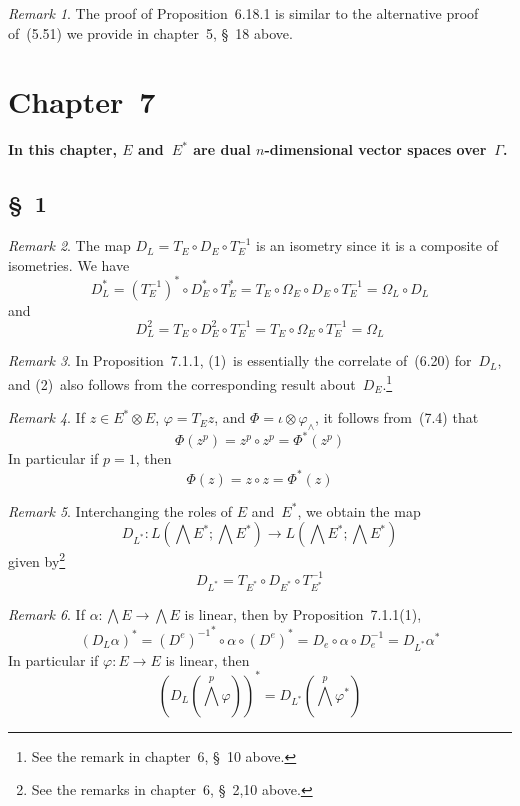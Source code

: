 \documentclass[letterpaper,12pt]{article}
\newcommand{\after}{\circ}
\newcommand{\tprod}{\otimes}
\newcommand{\eprod}{\wedge}
\newcommand{\bigeprod}{\bigwedge}
\newcommand{\medeprod}{{\textstyle\bigeprod}}
\theoremstyle{definition}
\theoremstyle{remark}
\newtheorem*{rmk}{Remark}
\begin{document}
\begin{rmk}
The proof of Proposition~6.18.1 is similar to the alternative proof of~(5.51) we provide in chapter~5, \S~18 above.
\end{rmk}

\newpage
\section*{Chapter~7}
{\boldmath\textbf{In this chapter, \(E\) and~\(E^*\) are dual \(n\)-dimensional vector spaces over~\(\Gamma\).}}

\subsection*{\S~1}
\begin{rmk}
The map \(D_L=T_E\after D_E\after T_E^{-1}\) is an isometry since it is a composite of isometries. We have
\[D_L^*=(T_E^{-1})^*\after D_E^*\after T_E^*=T_E\after\Omega_E\after D_E\after T_E^{-1}=\Omega_L\after D_L\]
and
\[D_L^2=T_E\after D_E^2\after T_E^{-1}=T_E\after\Omega_E\after T_E^{-1}=\Omega_L\]
\end{rmk}

\begin{rmk}
In Proposition~7.1.1, (1)~is essentially the correlate of~(6.20) for~\(D_L\), and (2)~also follows from the corresponding result about~\(D_E\).\footnote{See the remark in chapter~6, \S~10 above.}
\end{rmk}

\begin{rmk}
If \(z\in E^*\tprod E\), \(\varphi=T_Ez\), and \(\Phi=\iota\tprod\varphi_{\eprod}\), it follows from~(7.4) that
\[\Phi(z^p)=z^p\after z^p=\Phi^*(z^p)\]
In particular if \(p=1\), then
\[\Phi(z)=z\after z=\Phi^*(z)\]
\end{rmk}

\begin{rmk}
Interchanging the roles of \(E\) and~\(E^*\), we obtain the map
\[D_{L^*}:L(\medeprod E^*;\medeprod E^*)\to L(\medeprod E^*;\medeprod E^*)\]
given by\footnote{See the remarks in chapter~6, \S~2,10 above.}
\[D_{L^*}=T_{E^*}\after D_{E^*}\after T_{E^*}^{-1}\]
\end{rmk}

\begin{rmk}
If \(\alpha:\medeprod E\to\medeprod E\) is linear, then by Proposition~7.1.1(1),
\[(D_L\alpha)^*={(D^e)^{-1}}^*\after\alpha\after(D^e)^*=D_e\after\alpha\after D_e^{-1}=D_{L^*}\alpha^*\]
In particular if \(\varphi:E\to E\) is linear, then
\[(D_L(\medeprod^p\varphi))^*=D_{L^*}(\medeprod^p\varphi^*)\]
\end{rmk}
\end{document}
